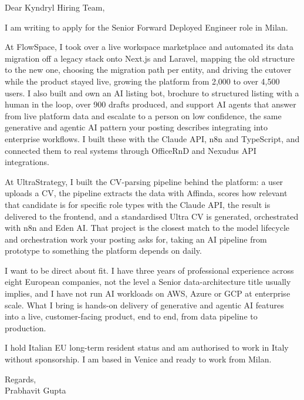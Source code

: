 \documentclass[a4paper,11pt]{article}
\begin{document}
Dear Kyndryl Hiring Team,

I am writing to apply for the Senior Forward Deployed Engineer role in Milan.

At FlowSpace, I took over a live workspace marketplace and automated its data migration off a legacy stack onto Next.js and Laravel, mapping the old structure to the new one, choosing the migration path per entity, and driving the cutover while the product stayed live, growing the platform from 2,000 to over 4,500 users. I also built and own an AI listing bot, brochure to structured listing with a human in the loop, over 900 drafts produced, and support AI agents that answer from live platform data and escalate to a person on low confidence, the same generative and agentic AI pattern your posting describes integrating into enterprise workflows. I built these with the Claude API, n8n and TypeScript, and connected them to real systems through OfficeRnD and Nexudus API integrations.

At UltraStrategy, I built the CV-parsing pipeline behind the platform: a user uploads a CV, the pipeline extracts the data with Affinda, scores how relevant that candidate is for specific role types with the Claude API, the result is delivered to the frontend, and a standardised Ultra CV is generated, orchestrated with n8n and Eden AI. That project is the closest match to the model lifecycle and orchestration work your posting asks for, taking an AI pipeline from prototype to something the platform depends on daily.

I want to be direct about fit. I have three years of professional experience across eight European companies, not the level a Senior data-architecture title usually implies, and I have not run AI workloads on AWS, Azure or GCP at enterprise scale. What I bring is hands-on delivery of generative and agentic AI features into a live, customer-facing product, end to end, from data pipeline to production.

I hold Italian EU long-term resident status and am authorised to work in Italy without sponsorship. I am based in Venice and ready to work from Milan.

Regards,\\
Prabhavit Gupta
\end{document}
